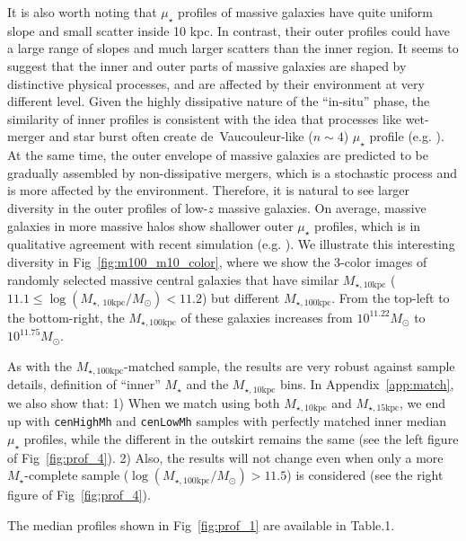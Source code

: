 \documentclass[a4paper,fleqn,usenatbib]{mnras}
\def\rbcg{\texttt{cenHighMh}}
\def\nbcg{\texttt{cenLowMh}}
\def\mstar{{$M_{\star}$}}
\def\minn{{$M_{\star,10\mathrm{kpc}}$}}
\def\meff{{$M_{\star,15\mathrm{kpc}}$}}
\def\mtot{{$M_{\star,100\mathrm{kpc}}$}}
\def\logmtot{{$\log (M_{\star,100\mathrm{kpc}}/M_{\odot})$}}
\def\mden{{$\mu_{\star}$}}
\begin{document}
    It is also worth noting that \mden{} profiles of massive galaxies have quite uniform
    slope and small scatter inside 10 kpc.  
    In contrast, their outer profiles could have a large range of slopes and much 
    larger scatters than the inner region. 
    It seems to suggest that the inner and outer parts of massive galaxies are shaped 
    by distinctive physical processes, and are affected by their environment at 
    very different level. 
    Given the highly dissipative nature of the ``in-situ'' phase, the similarity of 
    inner profiles is consistent with the idea that processes like wet-merger and 
    star burst often create de~Vaucouleur-like ($n\sim 4$) \mden{} profile
    (e.g. \citealt{Hopkins2008}).
    At the same time, the outer envelope of massive galaxies are predicted to be 
    gradually assembled by non-dissipative mergers, which is a stochastic process and 
    is more affected by the environment.  
    Therefore, it is natural to see larger diversity in the outer profiles of 
    low-$z$ massive galaxies. 
    On average, massive galaxies in more massive halos show shallower outer \mden{} 
    profiles, which is in qualitative agreement with recent simulation
    (e.g. \citealt{Pillepich2014}).
    We illustrate this interesting diversity in Fig~\ref{fig:m100_m10_color}, where 
    we show the 3-color images of randomly selected massive central galaxies that 
    have similar \minn{} ($11.1 \leq \log (M_{\star,\ 10\mathrm{kpc}}/M_{\odot}) < 11.2$)
    but different \mtot{}.   
    From the top-left to the bottom-right, the \mtot{} of these galaxies increases
    from $10^{11.22} M_{\odot}$ to $10^{11.75} M_{\odot}$.
    
    As with the \mtot{}-matched sample, the results are very robust against 
    sample details, definition of ``inner'' \mstar{} and the \minn{} bins. 
    In Appendix~\ref{app:match}, we also show that:
    1) When we match using both \minn{} and \meff{}, we end up with \rbcg{} and \nbcg{} 
    samples with perfectly matched inner median \mden{} profiles, while the different 
    in the outskirt remains the same (see the left figure of Fig~\ref{fig:prof_4}).  
    2) Also, the results will not change even when only a more \mstar{}-complete sample
    (\logmtot{}$> 11.5$) is considered (see the right figure of Fig~\ref{fig:prof_4}). 
      
    The median profiles shown in Fig~\ref{fig:prof_1} are available in Table.1.
\end{document}
